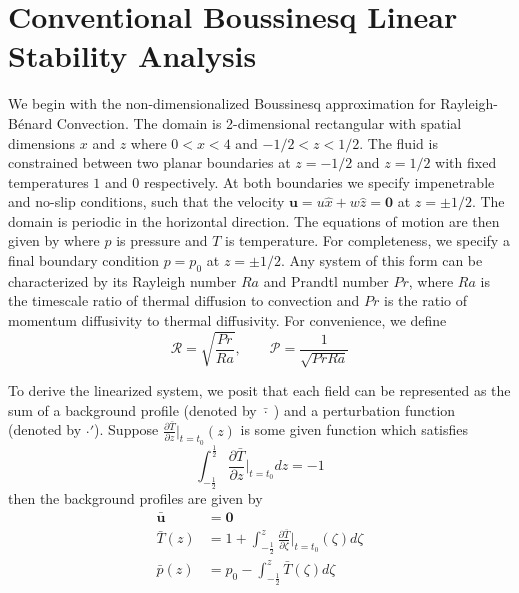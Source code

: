 \documentclass[reprint,amsmath,amssymb,aps]{revtex4-1}
\begin{document}
\section{Conventional Boussinesq Linear Stability Analysis}\label{sec:boussinesq}
We begin with the non-dimensionalized Boussinesq approximation for Rayleigh-Bénard Convection. The domain is 2-dimensional rectangular with spatial dimensions $x$ and $z$ where $0 < x < 4$ and $-1/2 < z < 1/2$. The fluid is constrained between two planar boundaries at $z = -1/2$ and $z = 1/2$ with fixed temperatures $1$ and $0$ respectively. At both boundaries we specify impenetrable and no-slip conditions, such that the velocity $\mathbf{u} = u \hat{x} + w \hat{z} = \mathbf{0}$ at $z = \pm 1/2$. The domain is periodic in the horizontal direction. The equations of motion are then given by
where $p$ is pressure and $T$ is temperature. For completeness, we specify a final boundary condition $p = p_0$ at $z = \pm 1/2$. Any system of this form can be characterized by its Rayleigh number $Ra$ and Prandtl number $Pr$, where $Ra$ is the timescale ratio of thermal diffusion to convection and $Pr$ is the ratio of momentum diffusivity to thermal diffusivity.  For convenience, we define 
\begin{equation}
\mathcal{R} = \sqrt{\frac{Pr}{Ra}}, \qquad \mathcal{P} = \frac{1}{\sqrt{Pr Ra}}
\end{equation}
\par To derive the linearized system, we posit that each field can be represented as the sum of a background profile (denoted by $\bar{\cdot } \;$) and a perturbation function (denoted by $\cdot'$). Suppose $\frac{\partial \bar{T}}{\partial z}\big|_{t=t_0} (z)$ is some given function which satisfies
\begin{equation}
    \int_{-\frac{1}{2}}^{\frac{1}{2}} \frac{\partial \bar{T}}{\partial z}\Big|_{t=t_0} dz = -1
\end{equation}
then the background profiles are given by
\begin{align}
    \mathbf{\bar{u}} &= \mathbf{0} \\
    \bar{T}(z) &= 1 + \int_{-\frac{1}{2}}^{z} \frac{\partial \bar{T}}{\partial \zeta}\Big|_{t=t_0}(\zeta) d\zeta \\
    \bar{p}(z) &= p_0 - \int_{-\frac{1}{2}}^z \bar{T}(\zeta) d\zeta
\end{align}
\end{document}
